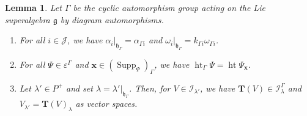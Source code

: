 \documentclass[11pt]{amsart}
\theoremstyle{plain}
\newtheorem{lemma}[thm]{Lemma}
\theoremstyle{definition}
\newcommand{\g}{\mathfrak{g}}
\newcommand{\h}{\mathfrak{h}}
\DeclareMathOperator{\Supp}{Supp}
\DeclareMathOperator{\het}{ht}
\begin{document}
\begin{lemma}\label{lem:13}
 Let $\Gamma$ be the cyclic automorphism group acting on the Lie superalgebra $\g$ by diagram automorphisms.
\begin{enumerate}[label=(\alph*)]
\item For all $i\in \mathcal{J}$, we have $\alpha_{i}|_{\h_{\Gamma}}=\alpha_{\Gamma i}$ and $\omega_{i}|_{\h_{\Gamma}}=k_{\Gamma i}\omega_{\Gamma i}$.
\item For all $\Psi\in\varepsilon^{\Gamma}$ and $\mathbf{x}\in (\Supp_{\Psi})_{\Gamma}$, we have $\het_{\Gamma}\Psi=\het\Psi_{\mathbf{x}}$.
\item Let $\lambda'\in P^{+}$ and set $\lambda=\lambda'|_{\h_{\Gamma}}$. Then, for $V\in \mathcal{I}_{\lambda'}$, we have $\textbf{T}(V)\in\mathcal{I}_{\lambda}^{\Gamma}$ and $V_{\lambda'}=\textbf{T}(V)_{\lambda}$ as vector spaces.
    \end{enumerate}
\end{lemma}
\end{document}

